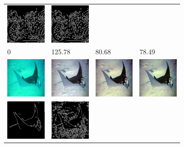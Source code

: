 \documentclass[conference]{IEEEtran}
\begin{document}
\begin{figure}
\begin{tabular}{p{1.7cm} p{1.7cm} p{1.7cm} p{1.5cm}}
   \includegraphics[width=0.8in]{n01496331_15872_u0edges}  &
   \includegraphics[width=0.8in]{n01496331_15872_u1edges}  \\
   0 & \small{125.78} & \small{80.68} & \small{78.49} \\

   \includegraphics[width=0.8in]{n01496331_22079_original} &
   \includegraphics[width=0.8in]{n01496331_22079_cimg}     & 
   \includegraphics[width=0.8in]{n01496331_22079_u0img}    &
   \includegraphics[width=0.8in]{n01496331_22079_u1img}    \\ [-1ex]
   \includegraphics[width=0.8in]{n01496331_22079_oedges}   &
   \includegraphics[width=0.8in]{n01496331_22079_cedges}   &

\end{tabular}
\end{figure}
\end{document}
